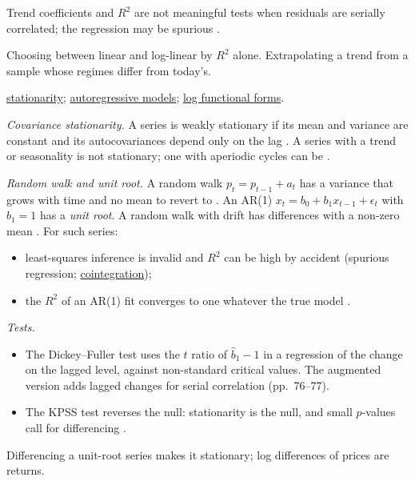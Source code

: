 \begin{qfmethod}
 Trend coefficients and $R^2$ are not meaningful tests when residuals are serially correlated; the regression may be spurious \citep[sec.~7.5]{s7-hyndman}.

 Choosing between linear and log-linear by $R^2$ alone. Extrapolating a trend from a sample whose regimes differ from today's.

 \hyperref[def:stationarity-unit-roots]{stationarity}; \hyperref[meth:autoregressive-forecasting]{autoregressive models}; \hyperref[meth:regression-prediction-functional-form]{log functional forms}.

\end{qfmethod}

\begin{qfdefinition}\label{def:stationarity-unit-roots}
 \emph{Covariance stationarity.} A series is weakly stationary if its mean and variance are constant and its autocovariances depend only on the lag \citep[pp.~30--31]{s7-tsay}. A series with a trend or seasonality is not stationary; one with aperiodic cycles can be \citep[sec.~9.1]{s7-hyndman}.

\emph{Random walk and unit root.} A random walk $p_t=p_{t-1}+a_t$ has a variance that grows with time and no mean to revert to \citep[p.~72]{s7-tsay}. An AR(1) $x_t=b_0+b_1x_{t-1}+\epsilon_t$ with $b_1=1$ has a \emph{unit root}. A random walk with drift has differences with a non-zero mean \citep[sec.~9.1]{s7-hyndman}. For such series:
\begin{itemize}
\item least-squares inference is invalid and $R^2$ can be high by accident (spurious regression; \hyperref[meth:cointegration-testing]{cointegration});
\item the $R^2$ of an AR(1) fit converges to one whatever the true model \citep[p.~54]{s7-tsay}.
\end{itemize}

\emph{Tests.}
\begin{itemize}
\item The Dickey--Fuller test uses the $t$ ratio of $\hat b_1-1$ in a regression of the change on the lagged level, against non-standard critical values. The augmented version adds lagged changes for serial correlation (pp.~76--77).
\item The KPSS test reverses the null: stationarity is the null, and small $p$-values call for differencing \citep[sec.~9.1]{s7-hyndman}.
\end{itemize}
Differencing a unit-root series makes it stationary; log differences of prices are returns.


\end{qfdefinition}
